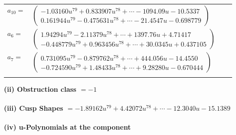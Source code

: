 \documentclass[1p]{elsarticle_modified}
\theoremstyle{definition}
\begin{document}
\begin{tabular}{m{7pt} m{180pt} m{7pt} m{180pt} }
\flushright $a_{10}=$&$\begin{pmatrix}-1.03160 u^{79}+0.833907 u^{78}+\cdots-1094.09 u-10.5337\\0.161944 u^{79}-0.475631 u^{78}+\cdots-21.4547 u-0.698779\end{pmatrix}$ \\
\flushright $a_{6}=$&$\begin{pmatrix}1.94294 u^{79}-2.11379 u^{78}+\cdots+1397.76 u+4.71417\\-0.448779 u^{79}+0.963456 u^{78}+\cdots+30.0345 u+0.437105\end{pmatrix}$ \\
\flushright $a_{7}=$&$\begin{pmatrix}0.731095 u^{79}-0.879762 u^{78}+\cdots+444.056 u-14.4550\\-0.724590 u^{79}+1.48433 u^{78}+\cdots+9.28280 u-0.670444\end{pmatrix}$\\&\end{tabular}
\flushleft \textbf{(ii) Obstruction class $= -1$}\\~\\
\flushleft \textbf{(iii) Cusp Shapes $= -1.89162 u^{79}+4.42072 u^{78}+\cdots-12.3040 u-15.1389$}\\~\\
\newpage\renewcommand{\arraystretch}{1}
\flushleft \textbf{(iv) u-Polynomials at the component}\newline \\
\end{document}

